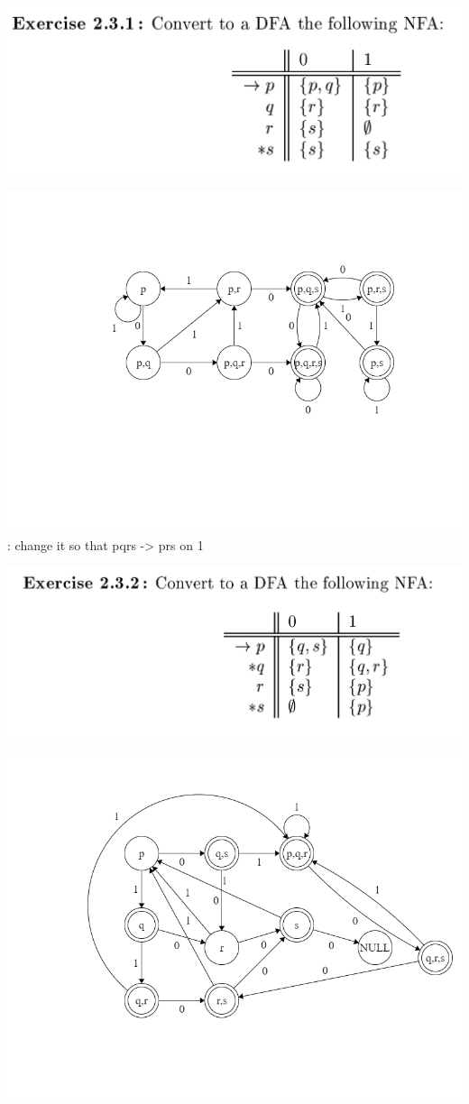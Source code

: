 \documentclass{article}
\theoremstyle{theorem}
\theoremstyle{definition}
\theoremstyle{remark}
\begin{document}
\includegraphics[scale=0.2]{Images/Week3.png}

\includegraphics[scale=0.4]{Images/2.3.1.png} : change it so that pqrs -> prs on 1

\includegraphics[scale=0.2]{Images/Week3a.png}

\includegraphics[scale=0.4]{Images/2.3.2.png}
\end{document}
